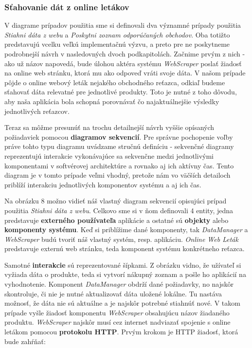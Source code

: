 \documentclass[twoside,slovak, a4paper]{article}
\begin{document}
\subsubsection{Sťahovanie dát z online letákov}

V diagrame prípadov použitia sme si definovali dva významné prípady použitia \textit{Stiahni dáta z webu} a \textit{Poskytni zoznam odporúčaných obchodov}. Oba totižto predstavujú vcelku veľkú implementačnú výzvu, a  preto pre ne poskytneme podrobnejší návrh v nasledovných dvoch podkapitolách. Začnime prvým z nich - ako už názov napovedá, bude úlohou aktéra systému \textit{WebScraper} poslať žiadosť na online web stránku, ktorá mu ako odpoveď vráti svoje dáta. V našom prípade pôjde o online webový leták nejakého obchodného reťazca, odkiaľ budeme sťahovať dáta relevatné pre jednotlivé produkty. Toto je nutné z toho dôvodu, aby naša aplikácia bola schopná porovnávať čo najaktuálnejšie výsledky jednotlivých reťazcov.

Teraz sa môžme presunúť na trochu detailnejší návrh vyššie opísaných požiadaviek pomocou \textbf{diagramov sekvencií}. Pre správne pochopenie voľby práve tohto typu diagramu uvádzame stručnú definíciu - sekvenčné diagramy reprezentujú interakcie vykonávajúce sa sekvenčne medzi jednotlivými komponentami v softvérovej architektúre a rovnako aj ich aktívny čas.\cite{KARAMPURE2021457} Tento diagram je v tomto prípade veľmi vhodný, pretože nám vo väčších detailoch priblíží interakciu jednotlivých komponentov systému a aj ich čas.

Na obrázku 8 možno vidieť náš vlastný diagram sekvencií opisujúci prípad použitia \textit{Stiahni dáta z webu}. Celkovo sme si v ňom definovali 4 entity, jedna predstavuje \textbf{externého používateľa} aplikácie a ostatné sú \textbf{objekty} alebo \textbf{komponenty systému}. Keď si priblížime dané komponenty, tak \textit{DataManager} a \textit{WebScraper} budú tvoriť náš vlastný systém, resp. aplikáciu. \textit{Online Web Leták} predstavuje externú web stránku, teda komponent systému konkrétneho reťazca.

Samotné \textbf{interakcie} sú reprezentované šípkami. Z obrázku vidno, že užívateľ si vyžiada dáta o produkte, teda si vytvorí nákupný zoznam a pošle ho aplikácií na vyhodnotenie. Komponent \textit{DataManager} obdrží dané požiadavky, no najskôr skontroluje, či nie je nutné aktualizovať dáta uložené lokálne. Tu nastáva možnosť, že dáta nie sú aktuálne a je najskôr potrebné stiahnúť nové. V takom prípade vyšle žiadosť komponentu \textit{WebScraper} obsahujúcu názov žiadaného produktu. \textit{WebScraper} najskôr musí cez internet nadviazať spojenie s online letákom pomocou \textbf{protokolu HTTP}. Prvým krokom je HTTP žiadosť, ktorá bude zahŕňať:
\end{document}

